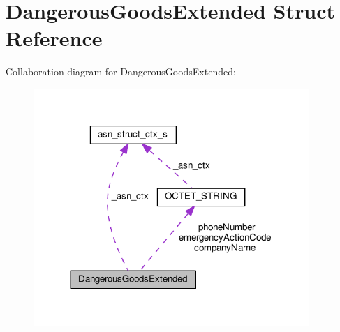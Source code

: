 \hypertarget{structDangerousGoodsExtended}{}\section{Dangerous\+Goods\+Extended Struct Reference}
\label{structDangerousGoodsExtended}


Collaboration diagram for Dangerous\+Goods\+Extended\+:\nopagebreak
\begin{figure}[H]
\begin{center}
\leavevmode
\includegraphics[width=296pt]{structDangerousGoodsExtended__coll__graph}
\end{center}
\end{figure}
